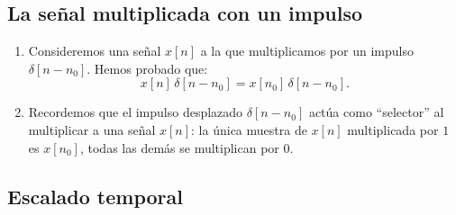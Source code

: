 \subsection{La señal multiplicada con un impulso}

\begin{enumerate}
	\item Consideremos una señal $x[n]$ a la que
	multiplicamos por un impulso $\delta[n - n_{0}]$. Hemos probado que:
	\begin{equation}
		x[n] \, \delta[n - n_{0}] = x[n_{0}] \, \delta[n - n_{0}].
	\end{equation}
	
	\item Recordemos que el impulso desplazado $\delta[n - n_{0}]$
	actúa como ``selector'' al multiplicar a una señal $x[n]$:
	la única muestra de $x[n]$ multiplicada por $1$ es $x[n_{0}]$,
	todas las demás se multiplican por $0$.
\end{enumerate}

\subsection{Escalado temporal}

